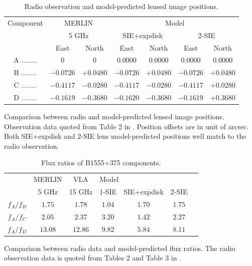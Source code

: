 \documentclass[useAMS,usenatbib]{mn2e}
\begin{document}
\begin{table}
 \begin{minipage}{140mm}
  \caption{Radio observation and model-predicted lensed image positions.}
  \begin{tabular}{@{}ccccccc}

\hline

Component	&\multicolumn{2}{c}{MERLIN} 	 & \multicolumn{4}{c}{Model} \\
					&\multicolumn{2}{c}{5 GHz}		&	\multicolumn{2}{c}{SIE+expdisk} &\multicolumn{2}{c}{ 2-SIE}		\\
					 &East &North &East 		&North &East 		&North\\ 
\hline
A ........ &$0$    		&$0$		&$0.0000$ &$0.0000$   &   $0.0000$   &  $ 0.0000$\\  
B ........ &$-0.0726$ 	&$+0.0480$	&$-0.0726$ &$+0.0480$ & $-0.0726 $  &  $+0.0480$  \\  
C ........ &$-0.4117$  &$-0.0280$	&$-0.4117$ &$-0.0280$  & $-0.4117 $  &   $+0.0280$ \\  
D ........ &$-0.1619$  &$-0.3680$	&$-0.1620$ &$-0.3680$  & $-0.1619$    &  $+0.3680$ \\  
\hline
\end{tabular}

\end{minipage}
\medskip

Comparison between radio and model-predicted lensed image positions. Observation data quoted from Table 2 in \citet{Marlow99}. Position offsets are in unit of arcsec. Both SIE+expdisk and 2-SIE lens model-predicted positions well match to the radio observation.

\end{table}

\begin{table}
  \caption{Flux ratios of B1555+375 components.}
  \begin{tabular}{@{}ccccccc}

\hline
	& MERLIN & VLA & \multicolumn{3}{l}{Model}\\
		&5 GHz & 15 GHz  & 1-SIE & SIE+expdisk & 2-SIE\\
\hline
$f_A/f_B$			&$1.75$ & $1.78$ &$1.04$& $1.70$ & $1.75$ \\ 
$f_A/f_C$		&$2.05$ 	&$2.37$ &$3.20$ & $1.42$ & $2.27$\\
$f_A/f_D$		&$13.08$ &$ 12.86$ &$9.82$& $5.84$ & $8.11$\\

\hline
\end{tabular}

\medskip
Comparison between radio data and model-predicted flux ratios. The radio observation data is quoted from Tables 2 and Table 3 in \citet{Marlow99}. 

\end{table}
\end{document}
